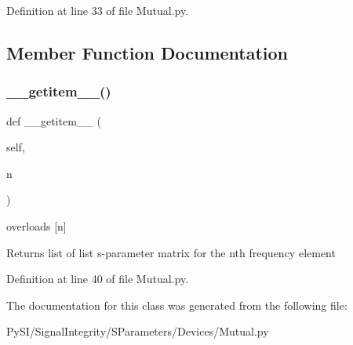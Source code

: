 Definition at line 33 of file Mutual.\+py.



\subsection{Member Function Documentation}
\mbox{\label{classSignalIntegrity_1_1SParameters_1_1Devices_1_1Mutual_1_1Mutual_ab7a6da5139e0878b590d68292aaa70f2}} 
\subsubsection{\texorpdfstring{\+\_\+\+\_\+getitem\+\_\+\+\_\+()}{\_\_getitem\_\_()}}
{\footnotesize\ttfamily def \+\_\+\+\_\+getitem\+\_\+\+\_\+ (\begin{DoxyParamCaption}\item[{}]{self,  }\item[{}]{n }\end{DoxyParamCaption})}



overloads \mbox{[}n\mbox{]} 

\begin{DoxyReturn}{Returns}
list of list s-\/parameter matrix for the nth frequency element 
\end{DoxyReturn}


Definition at line 40 of file Mutual.\+py.



The documentation for this class was generated from the following file\+:\begin{DoxyCompactItemize}
\item 
Py\+S\+I/\+Signal\+Integrity/\+S\+Parameters/\+Devices/Mutual.\+py\end{DoxyCompactItemize}
